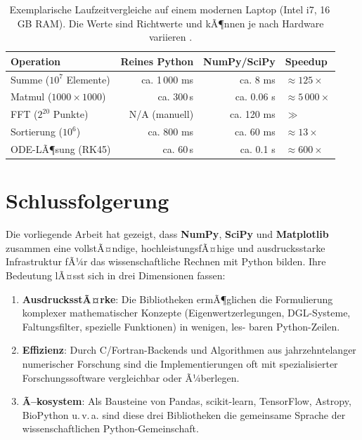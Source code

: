 \documentclass[12pt, a4paper]{article}
\begin{document}
\begin{table}[H]
  \centering
  \begin{tabular}{lrrl}
    \toprule
    \textbf{Operation} & \textbf{Reines Python} & \textbf{NumPy/SciPy} & \textbf{Speedup} \\
    \midrule
    Summe ($10^7$ Elemente) & ca. 1\,000 ms & ca. 8 ms & ${\approx}125\times$ \\
    Matmul ($1000\times1000$) & ca. 300\,s & ca. 0.06 s & ${\approx}5\,000\times$ \\
    FFT ($2^{20}$ Punkte) & N/A (manuell) & ca. 120 ms & $\gg$ \\
    Sortierung ($10^6$) & ca. 800 ms & ca. 60 ms & ${\approx}13\times$ \\
    ODE-LÃ¶sung (RK45) & ca. 60\,s & ca. 0.1 s & ${\approx}600\times$ \\
    \bottomrule
  \end{tabular}
  \caption{Exemplarische Laufzeitvergleiche auf einem modernen Laptop
           (Intel i7, 16\,GB RAM). Die Werte sind Richtwerte und kÃ¶nnen
           je nach Hardware variieren \cite{vanderplas2016python}.}
  \label{tab:perf}
\end{table}

\section{Schlussfolgerung}
\label{sec:conclusion}

Die vorliegende Arbeit hat gezeigt, dass \textbf{NumPy}, \textbf{SciPy}
und \textbf{Matplotlib} zusammen eine vollstÃ¤ndige, hochleistungsfÃ¤hige
und ausdrucksstarke Infrastruktur fÃ¼r das wissenschaftliche Rechnen mit
Python bilden. Ihre Bedeutung lÃ¤sst sich in drei Dimensionen fassen:

\begin{enumerate}
  \item \textbf{AusdrucksstÃ¤rke}: Die Bibliotheken ermÃ¶glichen die
  Formulierung komplexer mathematischer Konzepte (Eigenwertzerlegungen,
  DGL-Systeme, Faltungsfilter, spezielle Funktionen) in wenigen, les-
  baren Python-Zeilen.
  
  \item \textbf{Effizienz}: Durch C/Fortran-Backends und Algorithmen
  aus jahrzehntelanger numerischer Forschung sind die Implementierungen
  oft mit spezialisierter Forschungssoftware vergleichbar oder Ã¼berlegen.
  
  \item \textbf{Ã–kosystem}: Als Bausteine von Pandas, scikit-learn,
  TensorFlow, Astropy, BioPython u.\,v.\,a. sind diese drei Bibliotheken
  die gemeinsame Sprache der wissenschaftlichen Python-Gemeinschaft.
\end{enumerate}
\end{document}
